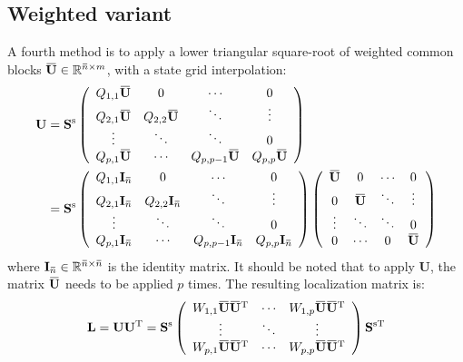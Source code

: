 \documentclass[12pt]{scrartcl}
\newcommand{\overbar}[1]{\mkern 1.5mu\overline{\mkern-1.5mu#1\mkern-1.5mu}\mkern 1.5mu}
\begin{document}
\subsection{Weighted variant}
A fourth method is to apply a lower triangular square-root of weighted common blocks $\overbar{\mathbf{U}} \in \mathbb{R}^{\overbar{n} \times m}$, with a state grid interpolation:
\begin{align}
\mathbf{U} & = \mathbf{S}^\mathrm{s} \left( \begin{array}{cccc}
Q_{1,1} \overbar{\mathbf{U}} & 0 & \cdots & 0 \\
Q_{2,1} \overbar{\mathbf{U}} & Q_{2,2} \overbar{\mathbf{U}} & \ddots & \vdots \\
\vdots & \ddots & \ddots & 0 \\
Q_{p,1} \overbar{\mathbf{U}} & \cdots & Q_{p,p-1} \overbar{\mathbf{U}} & Q_{p,p} \overbar{\mathbf{U}}
\end{array} \right) \\
 & = \mathbf{S}^\mathrm{s} \left( \begin{array}{cccc}
Q_{1,1} \mathbf{I}_{\overbar{n}} & 0 & \cdots & 0 \\
Q_{2,1} \mathbf{I}_{\overbar{n}} & Q_{2,2} \mathbf{I}_{\overbar{n}} & \ddots & \vdots \\
\vdots & \ddots & \ddots & 0 \\
Q_{p,1} \mathbf{I}_{\overbar{n}} & \cdots & Q_{p,p-1} \mathbf{I}_{\overbar{n}} & Q_{p,p} \mathbf{I}_{\overbar{n}}
\end{array} \right) \left( \begin{array}{cccc}
\overbar{\mathbf{U}} & 0 & \cdots & 0 \\
0 & \overbar{\mathbf{U}} & \ddots & \vdots \\
\vdots & \ddots & \ddots & 0 \\
0 & \cdots & 0 & \overbar{\mathbf{U}}
\end{array} \right)
\end{align}
where $\mathbf{I}_{\overbar{n}} \in \mathbb{R}^{\overbar{n} \times \overbar{n}}$ is the identity matrix. It should be noted that to apply $\mathbf{U}$, the matrix $\overbar{\mathbf{U}}$ needs to be applied $p$ times. The resulting localization matrix is:
\begin{align}
\mathbf{L} = \mathbf{U} \mathbf{U}^\mathrm{T} = \mathbf{S}^\mathrm{s} \left( \begin{array}{ccc}
W_{1,1} \overbar{\mathbf{U}} \overbar{\mathbf{U}}^\mathrm{T} & \cdots & W_{1,p} \overbar{\mathbf{U}} \overbar{\mathbf{U}}^\mathrm{T} \\
\vdots & \ddots & \vdots  \\
W_{p,1} \overbar{\mathbf{U}} \overbar{\mathbf{U}}^\mathrm{T} & \cdots & W_{p,p} \overbar{\mathbf{U}} \overbar{\mathbf{U}}^\mathrm{T}
\end{array} \right) \mathbf{S}^{\mathrm{s} \mathrm{T}}
\end{align}
\end{document}
